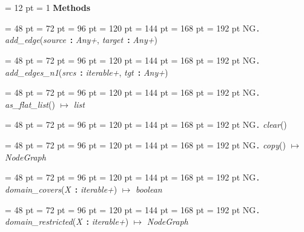 {{{{{} \noindent
\par}
{\par \pagebreak[3.200000] \noindent \hangindent = 12 pt \hangafter = 1 
{\bf {\large {\bf Methods\/}}\/}\par}
{\par \noindent  \leftskip = 48 pt  \leftmargini = 72 pt  \leftmarginii = 96 pt  \leftmarginiii = 120 pt  \leftmarginiv = 144 pt  \leftmarginv = 168 pt  \leftmarginvi = 192 pt NG{\large {\tt .\/} {\em add{\_}edge\/}}({\em source\/}~{\bf :}  {\em Any+\/}, {\em target\/}~{\bf :}  {\em Any+\/})\par}
{\par \noindent  \leftskip = 48 pt  \leftmargini = 72 pt  \leftmarginii = 96 pt  \leftmarginiii = 120 pt  \leftmarginiv = 144 pt  \leftmarginv = 168 pt  \leftmarginvi = 192 pt NG{\large {\tt .\/} {\em add{\_}edges{\_}n1\/}}({\em srcs\/}~{\bf :}  {\em iterable+\/}, {\em tgt\/}~{\bf :}  {\em Any+\/})\par}
{\par \noindent  \leftskip = 48 pt  \leftmargini = 72 pt  \leftmarginii = 96 pt  \leftmarginiii = 120 pt  \leftmarginiv = 144 pt  \leftmarginv = 168 pt  \leftmarginvi = 192 pt NG{\large {\tt .\/} {\em as{\_}flat{\_}list\/}}() \(\mapsto \)  {\em list\/}\par}
{\par \noindent  \leftskip = 48 pt  \leftmargini = 72 pt  \leftmarginii = 96 pt  \leftmarginiii = 120 pt  \leftmarginiv = 144 pt  \leftmarginv = 168 pt  \leftmarginvi = 192 pt NG{\large {\tt .\/} {\em clear\/}}()\par}
{\par \noindent  \leftskip = 48 pt  \leftmargini = 72 pt  \leftmarginii = 96 pt  \leftmarginiii = 120 pt  \leftmarginiv = 144 pt  \leftmarginv = 168 pt  \leftmarginvi = 192 pt NG{\large {\tt .\/} {\em copy\/}}() \(\mapsto \)  {\em NodeGraph\/}\par}
{\par \noindent  \leftskip = 48 pt  \leftmargini = 72 pt  \leftmarginii = 96 pt  \leftmarginiii = 120 pt  \leftmarginiv = 144 pt  \leftmarginv = 168 pt  \leftmarginvi = 192 pt NG{\large {\tt .\/} {\em domain{\_}covers\/}}({\em X\/}~{\bf :}  {\em iterable+\/}) \(\mapsto \)  {\em boolean\/}\par}
{\par \noindent  \leftskip = 48 pt  \leftmargini = 72 pt  \leftmarginii = 96 pt  \leftmarginiii = 120 pt  \leftmarginiv = 144 pt  \leftmarginv = 168 pt  \leftmarginvi = 192 pt NG{\large {\tt .\/} {\em domain{\_}restricted\/}}({\em X\/}~{\bf :}  {\em iterable+\/}) \(\mapsto \)  {\em NodeGraph\/}\par}
}}}

